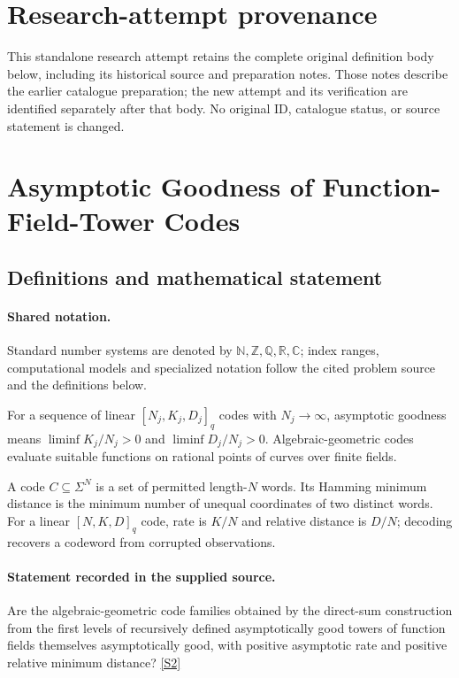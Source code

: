 \documentclass[11pt]{article}
\begin{document}
\section*{Research-attempt provenance}
This standalone research attempt retains the complete original definition body below,
including its historical source and preparation notes. Those notes describe the
earlier catalogue preparation; the new attempt and its verification are identified
separately after that body. No original ID, catalogue status, or source statement is changed.

\section{Asymptotic Goodness of Function-Field-Tower Codes}\label{statement}

\subsection{Definitions and mathematical statement}

\paragraph{Shared notation.}Standard number systems are denoted by $\mathbb N,\mathbb Z,\mathbb Q,\mathbb R,\mathbb C$; index ranges, computational models and specialized notation follow the cited problem source and the definitions below.


For a sequence of linear $[N_j,K_j,D_j]_q$ codes with $N_j\to\infty$, asymptotic goodness means $\liminf K_j/N_j>0$ and $\liminf D_j/N_j>0$. Algebraic-geometric codes evaluate suitable functions on rational points of curves over finite fields.

A code $C\subseteq\Sigma^N$ is a set of permitted length-$N$ words. Its Hamming minimum distance is the minimum number of unequal coordinates of two distinct words. For a linear $[N,K,D]_q$ code, rate is $K/N$ and relative distance is $D/N$; decoding recovers a codeword from corrupted observations.
\paragraph{Statement recorded in the supplied source.}
Are the algebraic-geometric code families obtained by the direct-sum construction from the first levels of recursively defined asymptotically good towers of function fields themselves asymptotically good, with positive asymptotic rate and positive relative minimum distance? \href{https://doi.org/10.4171/owr/2004/54}{[S2]}
\end{document}
